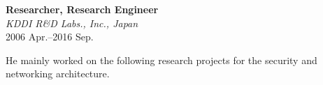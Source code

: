 
\textbf{Researcher, Research Engineer}\\
\hspace*{4ex}\textit{KDDI R\&D Labs.\@, Inc., Japan}\\
\hspace*{4ex}2006 Apr.--2016 Sep.

\hspace*{4ex} He mainly worked on the following research projects for the security and networking architecture.

